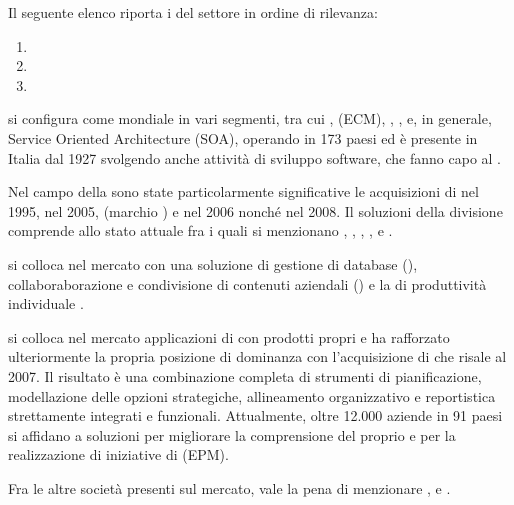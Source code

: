 Il seguente elenco riporta i  del settore in ordine di rilevanza:
\begin{enumerate}
  \item {}
  \item {}
  \item {}
\end{enumerate}

 si configura come  mondiale in vari segmenti, tra cui ,  (ECM), , ,  e, in generale, Service Oriented Architecture (SOA), operando in 173 paesi ed è presente in Italia dal 1927 svolgendo anche attività di sviluppo software, che fanno capo al .

Nel campo della \bsn {} sono state particolarmente significative le acquisizioni di  nel 1995,  nel 2005,  (marchio ) e  nel 2006 nonché  nel 2008. Il  soluzioni della divisione  comprende allo stato attuale  fra i quali si menzionano , , , ,  e .

 si colloca nel mercato con una soluzione di gestione di database (), collaboraborazione e condivisione di contenuti aziendali () e la  di produttività individuale .

 si colloca nel mercato applicazioni di \bsn {} con prodotti propri e ha rafforzato ulteriormente la propria posizione di dominanza con l'acquisizione di  che risale al 2007. Il risultato è una combinazione completa di strumenti di pianificazione, modellazione delle opzioni strategiche, allineamento organizzativo e reportistica strettamente integrati e funzionali. Attualmente, oltre 12.000 aziende in 91 paesi si affidano a soluzioni  per migliorare la comprensione del proprio \bsn e per la realizzazione di iniziative di  (EPM).

Fra le altre società presenti sul mercato, vale la pena di menzionare ,  e .

